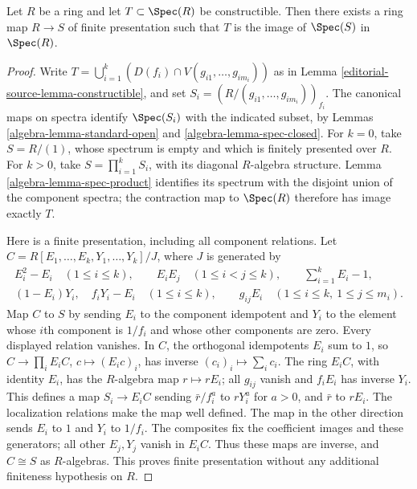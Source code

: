 \begin{lemma}
\label{editorial-source-lemma-constructible-is-image}
Let $R$ be a ring and let $T \subset \Spec(R)$
be constructible. Then there exists a ring map $R \to S$ of
finite presentation such that $T$ is the image of
$\Spec(S)$ in $\Spec(R)$.
\end{lemma}

\begin{proof}
Write
$T=\bigcup_{i=1}^k(D(f_i)\cap V(g_{i1},\ldots,g_{im_i}))$
as in Lemma \ref{editorial-source-lemma-constructible}, and set
$S_i=(R/(g_{i1},\ldots,g_{im_i}))_{f_i}$.
The canonical maps on spectra identify $\Spec(S_i)$ with the indicated
subset, by Lemmas \ref{algebra-lemma-standard-open} and \ref{algebra-lemma-spec-closed}.
For $k=0$, take $S=R/(1)$, whose spectrum is empty and which is finitely
presented over $R$. For $k>0$, take $S=\prod_{i=1}^kS_i$, with its
diagonal $R$-algebra structure. Lemma \ref{algebra-lemma-spec-product} identifies
its spectrum with the disjoint union of the component spectra; the
contraction map to $\Spec(R)$ therefore has image exactly $T$.

\medskip\noindent
Here is a finite presentation, including all component relations. Let
$C=R[E_1,\ldots,E_k,Y_1,\ldots,Y_k]/J$, where $J$ is generated by
$$
\begin{gathered}
E_i^2-E_i\quad(1\leq i\leq k),\qquad
E_iE_j\quad(1\leq i<j\leq k),\qquad
\sum_{i=1}^kE_i-1,\\
(1-E_i)Y_i,\quad f_iY_i-E_i\quad(1\leq i\leq k),\qquad
g_{ij}E_i\quad(1\leq i\leq k,\ 1\leq j\leq m_i).
\end{gathered}
$$
Map $C$ to $S$ by sending $E_i$ to the component idempotent and $Y_i$
to the element whose $i$th component is $1/f_i$ and whose other
components are zero. Every displayed relation vanishes. In $C$, the
orthogonal idempotents $E_i$ sum to $1$, so
$C\longrightarrow\prod_iE_iC$, $c\longmapsto(E_ic)_i$, has inverse
$(c_i)_i\longmapsto\sum_i c_i$. The ring $E_iC$, with identity $E_i$,
has the $R$-algebra map $r\mapsto rE_i$; all $g_{ij}$ vanish and
$f_iE_i$ has inverse $Y_i$. This defines a map $S_i\to E_iC$ sending
$\bar r/f_i^a$ to $rY_i^a$ for $a>0$, and $\bar r$ to $rE_i$.
The localization relations make the map well defined. The map in the
other direction sends $E_i$ to $1$ and $Y_i$ to $1/f_i$.
The composites fix the coefficient images and these generators; all
other $E_j,Y_j$ vanish in $E_iC$. Thus these maps are inverse, and
$C\cong S$ as $R$-algebras. This proves finite presentation without
any additional finiteness hypothesis on $R$.
\end{proof}